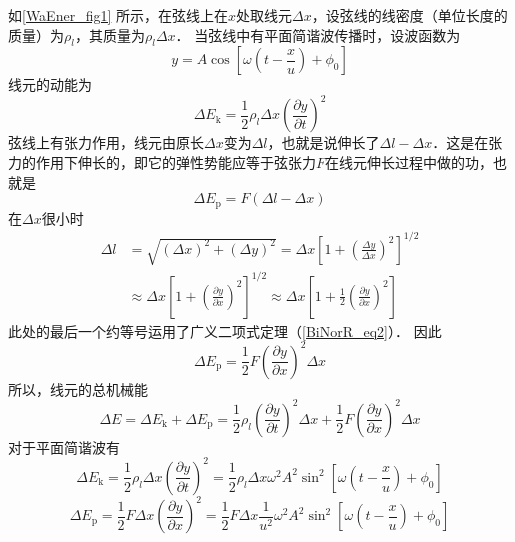 如\autoref{WaEner_fig1} 所示，在弦线上在$x$处取线元$\Delta x$，设弦线的线密度（单位长度的质量）为$\rho_l$，其质量为$\rho_l\Delta x$．
当弦线中有平面简谐波传播时，设波函数为
\begin{equation}
y=A \cos \left[\omega\left(t-\frac{x}{u}\right)+\phi_{0}\right]
\end{equation}
线元的动能为
\begin{equation}
\Delta E_{\mathrm{k}}=\frac{1}{2} \rho_{l} \Delta x\left(\frac{\partial y}{\partial t}\right)^{2}
\end{equation}
弦线上有张力作用，线元由原长$\Delta x$变为$\Delta l$，也就是说伸长了$\Delta l-\Delta x$．这是在张力的作用下伸长的，即它的弹性势能应等于弦张力$F$在线元伸长过程中做的功，也就是
\begin{equation}
\Delta E_{\mathrm{p}}=F(\Delta l-\Delta x)
\end{equation}
在$\Delta x$很小时
\begin{equation}
\begin{aligned} \Delta l &=\sqrt{(\Delta x)^{2}+(\Delta y)^{2}}=\Delta x\left[1+\left(\frac{\Delta y}{\Delta x}\right)^{2}\right]^{1 / 2} \\ & \approx \Delta x\left[1+\left(\frac{\partial y}{\partial x}\right)^{2}\right]^{1 / 2} \approx \Delta x\left[1+\frac{1}{2}\left(\frac{\partial y}{\partial x}\right)^{2}\right] \end{aligned}
\end{equation}
此处的最后一个约等号运用了广义二项式定理（\autoref{BiNorR_eq2}）．
因此
\begin{equation}
\Delta E_{\mathrm{p}}=\frac{1}{2} F\left(\frac{\partial y}{\partial x}\right)^{2} \Delta x
\end{equation}
所以，线元的总机械能
\begin{equation}
\Delta E=\Delta E_{\mathrm{k}}+\Delta E_{\mathrm{p}}=\frac{1}{2} \rho_{l}\left(\frac{\partial y}{\partial t}\right)^{2} \Delta x+\frac{1}{2} F\left(\frac{\partial y}{\partial x}\right)^{2} \Delta x
\end{equation}
对于平面简谐波有
\begin{equation}
\Delta E_{\mathrm{k}}=\frac{1}{2} \rho_{l} \Delta x\left(\frac{\partial y}{\partial t}\right)^{2}=\frac{1}{2} \rho_{l} \Delta x \omega^{2} A^{2} \sin ^{2}\left[\omega\left(t-\frac{x}{u}\right)+\phi_{0}\right]
\end{equation}
\begin{equation}
\Delta E_{\mathrm{p}}=\frac{1}{2} F \Delta x\left(\frac{\partial y}{\partial x}\right)^{2}=\frac{1}{2} F \Delta x \frac{1}{u^{2}} \omega^{2} A^{2} \sin ^{2}\left[\omega\left(t-\frac{x}{u}\right)+\phi_{0}\right]
\end{equation}
